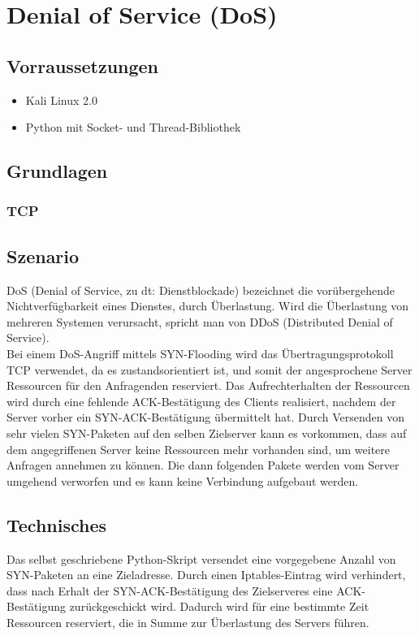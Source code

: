 \section{Denial of Service (DoS)}


\subsection*{Vorraussetzungen}

\begin{itemize}
\item Kali Linux 2.0
\item Python mit Socket- und Thread-Bibliothek
\end{itemize}


\subsection*{Grundlagen}

\subsubsection*{TCP}

\subsection*{Szenario}

DoS (Denial of Service, zu dt: Dienstblockade) bezeichnet die vorübergehende Nichtverfügbarkeit eines Dienstes, durch Überlastung. Wird die Überlastung von mehreren Systemen verursacht,
spricht man von DDoS (Distributed Denial of Service). \\
Bei einem DoS-Angriff mittels SYN-Flooding wird das Übertragungsprotokoll TCP verwendet, da es zustandsorientiert ist, und somit der angesprochene Server Ressourcen für den Anfragenden reserviert.
 Das Aufrechterhalten der Ressourcen wird durch eine fehlende ACK-Bestätigung des Clients realisiert, nachdem der Server vorher ein SYN-ACK-Bestätigung übermittelt hat. Durch Versenden von sehr vielen SYN-Paketen auf den selben Zielserver kann es vorkommen, dass auf dem angegriffenen Server keine Ressourcen mehr vorhanden sind, um weitere Anfragen annehmen zu können. Die dann folgenden Pakete werden vom Server umgehend verworfen und es kann keine Verbindung aufgebaut werden.

\subsection*{Technisches}
Das selbst geschriebene Python-Skript versendet eine vorgegebene Anzahl von SYN-Paketen an eine Zieladresse. Durch einen Iptables-Eintrag wird verhindert, dass nach Erhalt der SYN-ACK-Bestätigung
des Zielserveres eine ACK-Bestätigung zurückgeschickt wird. Dadurch wird für eine bestimmte Zeit Ressourcen reserviert, die in Summe zur Überlastung des Servers führen.

